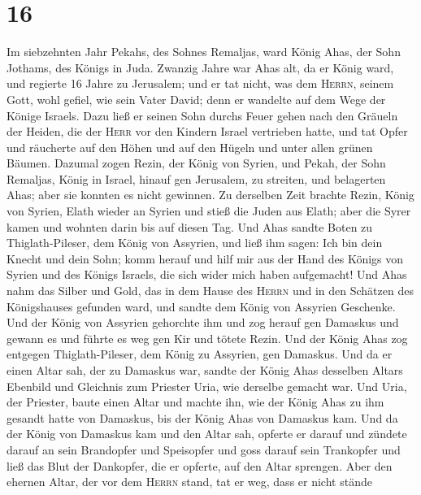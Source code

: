 \hypertarget{section-15}{%
\section{16}\label{section-15}}

 Im siebzehnten Jahr Pekahs, des Sohnes Remaljas, ward
König Ahas, der Sohn Jothams, des Königs in Juda.  Zwanzig
Jahre war Ahas alt, da er König ward, und regierte 16 Jahre zu
Jerusalem; und er tat nicht, was dem \textsc{Herrn}, seinem Gott, wohl
gefiel, wie sein Vater David;  denn er wandelte auf dem
Wege der Könige Israels. Dazu ließ er seinen Sohn durchs Feuer gehen
nach den Gräueln der Heiden, die der \textsc{Herr} vor den Kindern
Israel vertrieben hatte,  und tat Opfer und räucherte auf
den Höhen und auf den Hügeln und unter allen grünen Bäumen.
 Dazumal zogen Rezin, der König von Syrien, und Pekah, der
Sohn Remaljas, König in Israel, hinauf gen Jerusalem, zu streiten, und
belagerten Ahas; aber sie konnten es nicht gewinnen.  Zu
derselben Zeit brachte Rezin, König von Syrien, Elath wieder an Syrien
und stieß die Juden aus Elath; aber die Syrer kamen und wohnten darin
bis auf diesen Tag.  Und Ahas sandte Boten zu
Thiglath-Pileser, dem König von Assyrien, und ließ ihm sagen: Ich bin
dein Knecht und dein Sohn; komm herauf und hilf mir aus der Hand des
Königs von Syrien und des Königs Israels, die sich wider mich haben
aufgemacht!  Und Ahas nahm das Silber und Gold, das in dem
Hause des \textsc{Herrn} und in den Schätzen des Königshauses gefunden
ward, und sandte dem König von Assyrien Geschenke.  Und
der König von Assyrien gehorchte ihm und zog herauf gen Damaskus und
gewann es und führte es weg gen Kir und tötete Rezin. 
Und der König Ahas zog entgegen Thiglath-Pileser, dem König zu Assyrien,
gen Damaskus. Und da er einen Altar sah, der zu Damaskus war, sandte der
König Ahas desselben Altars Ebenbild und Gleichnis zum Priester Uria,
wie derselbe gemacht war.  Und Uria, der Priester, baute
einen Altar und machte ihn, wie der König Ahas zu ihm gesandt hatte von
Damaskus, bis der König Ahas von Damaskus kam.  Und da
der König von Damaskus kam und den Altar sah, opferte er darauf
 und zündete darauf an sein Brandopfer und Speisopfer und
goss darauf sein Trankopfer und ließ das Blut der Dankopfer, die er
opferte, auf den Altar sprengen.  Aber den ehernen Altar,
der vor dem \textsc{Herrn} stand, tat er weg, dass er nicht stände
